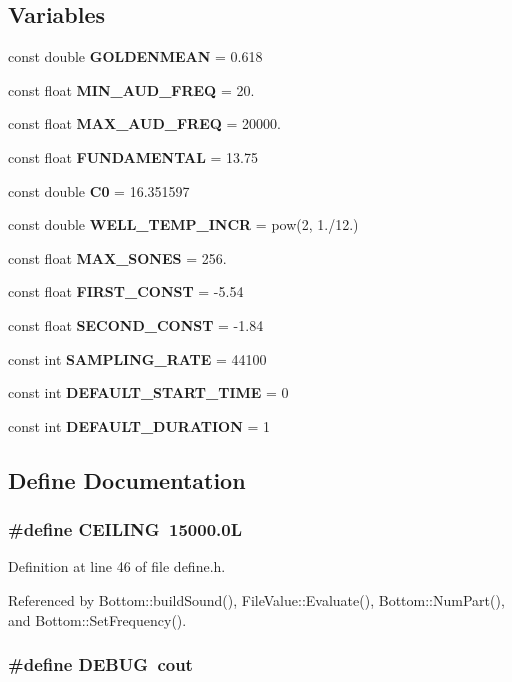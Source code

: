 \subsection*{Variables}
\begin{CompactItemize}
\item 
const  double {\bf GOLDENMEAN} = 0.618
\item 
const  float {\bf MIN\_\-AUD\_\-FREQ} = 20.
\item 
const  float {\bf MAX\_\-AUD\_\-FREQ} = 20000.
\item 
const  float {\bf FUNDAMENTAL} = 13.75
\item 
const  double {\bf C0} = 16.351597
\item 
const  double {\bf WELL\_\-TEMP\_\-INCR} = pow(2, 1./12.)
\item 
const  float {\bf MAX\_\-SONES} = 256.
\item 
const  float {\bf FIRST\_\-CONST} = -5.54
\item 
const  float {\bf SECOND\_\-CONST} = -1.84
\item 
const  int {\bf SAMPLING\_\-RATE} = 44100
\item 
const  int {\bf DEFAULT\_\-START\_\-TIME} = 0
\item 
const  int {\bf DEFAULT\_\-DURATION} = 1
\end{CompactItemize}


\subsection{Define Documentation}
\subsubsection{\setlength{\rightskip}{0pt plus 5cm}\#define CEILING\ 15000.0L}\label{define_8h_a2}




Definition at line 46 of file define.h.

Referenced by Bottom::build\-Sound(), File\-Value::Evaluate(), Bottom::Num\-Part(), and Bottom::Set\-Frequency().
\subsubsection{\setlength{\rightskip}{0pt plus 5cm}\#define DEBUG\ cout}\label{define_8h_a0}




